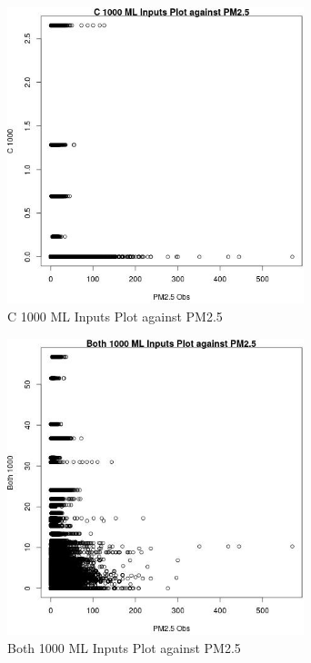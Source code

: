 \begin{figure} 
\centering  
\includegraphics[width=0.77\textwidth]{Code_Outputs/ML_input_report_ML_input_PM25_Step5_part_d_de_duplicated_aves_ML_input_C_1000vPM25_Obs.jpg} 
\caption{\label{fig:ML_input_report_ML_input_PM25_Step5_part_d_de_duplicated_aves_ML_inputC_1000vPM25_Obs}C 1000 ML Inputs Plot against PM2.5} 
\end{figure} 
 

\begin{figure} 
\centering  
\includegraphics[width=0.77\textwidth]{Code_Outputs/ML_input_report_ML_input_PM25_Step5_part_d_de_duplicated_aves_ML_input_Both_1000vPM25_Obs.jpg} 
\caption{\label{fig:ML_input_report_ML_input_PM25_Step5_part_d_de_duplicated_aves_ML_inputBoth_1000vPM25_Obs}Both 1000 ML Inputs Plot against PM2.5} 
\end{figure} 
 

